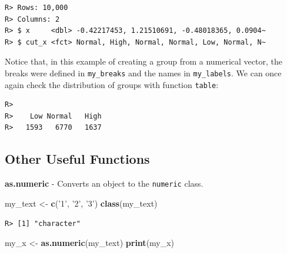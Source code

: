\documentclass[
  12pt,
]{book}
\newenvironment{Shaded}{\begin{snugshade}}{\end{snugshade}}
\newcommand{\KeywordTok}[1]{\textcolor[rgb]{0.27,0.27,0.27}{\textbf{#1}}}
\newcommand{\NormalTok}[1]{#1}
\newcommand{\OperatorTok}[1]{\textcolor[rgb]{0.43,0.43,0.43}{\textbf{#1}}}
\newcommand{\StringTok}[1]{\textcolor[rgb]{0.5,0.5,0.5}{#1}}
\begin{document}
\begin{verbatim}
R> Rows: 10,000
R> Columns: 2
R> $ x     <dbl> -0.42217453, 1.21510691, -0.48018365, 0.0904~
R> $ cut_x <fct> Normal, High, Normal, Normal, Low, Normal, N~
\end{verbatim}

Notice that, in this example of creating a group from a numerical vector, the breaks were defined in \texttt{my\_breaks} and the names in \texttt{my\_labels}. We can once again check the distribution of groups with function \texttt{table}:

\begin{Shaded}
\end{Shaded}

\begin{verbatim}
R> 
R>    Low Normal   High 
R>   1593   6770   1637
\end{verbatim}

\hypertarget{other-useful-functions-2}{%
\subsection{Other Useful Functions}\label{other-useful-functions-2}}

\textbf{as.numeric} - Converts an object to the \texttt{numeric} class. 

\begin{Shaded}
\begin{Highlighting}[]
\NormalTok{my_text <-}\StringTok{ }\KeywordTok{c}\NormalTok{(}\StringTok{'1'}\NormalTok{, }\StringTok{'2'}\NormalTok{, }\StringTok{'3'}\NormalTok{)}
\KeywordTok{class}\NormalTok{(my_text)}
\end{Highlighting}
\end{Shaded}

\begin{verbatim}
R> [1] "character"
\end{verbatim}

\begin{Shaded}
\begin{Highlighting}[]
\NormalTok{my_x <-}\StringTok{ }\KeywordTok{as.numeric}\NormalTok{(my_text)}
\KeywordTok{print}\NormalTok{(my_x)}
\end{Highlighting}
\end{Shaded}
\end{document}
